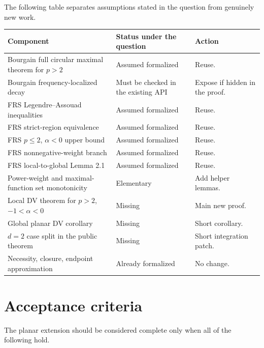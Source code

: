 \documentclass[11pt,a4paper]{article}
\theoremstyle{definition}
\theoremstyle{remark}
\begin{document}
The following table separates assumptions stated in the question from genuinely
new work.

\begin{longtable}{p{}p{}p{}}
\toprule
Component & Status under the question & Action \\
\midrule
\endhead
Bourgain full circular maximal theorem for $p>2$ & Assumed formalized & Reuse. \\
Bourgain frequency-localized decay & Must be checked in the existing API &
Expose if hidden in the proof. \\
FRS Legendre--Assouad inequalities & Assumed formalized & Reuse. \\
FRS strict-region equivalence & Assumed formalized & Reuse. \\
FRS $p\leq2$, $\alpha<0$ upper bound & Assumed formalized & Reuse. \\
FRS nonnegative-weight branch & Assumed formalized & Reuse. \\
FRS local-to-global Lemma 2.1 & Assumed formalized & Reuse. \\
Power-weight and maximal-function set monotonicity & Elementary & Add helper lemmas. \\
Local DV theorem for $p>2$, $-1<\alpha<0$ & Missing & Main new proof. \\
Global planar DV corollary & Missing & Short corollary. \\
$d=2$ case split in the public theorem & Missing & Short integration patch. \\
Necessity, closure, endpoint approximation & Already formalized & No change. \\
\bottomrule
\end{longtable}

\section{Acceptance criteria}

The planar extension should be considered complete only when all of the
following hold.
\end{document}
